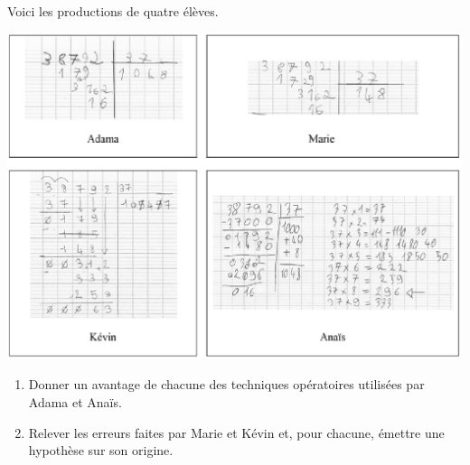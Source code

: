 \begin{exercice}[CRPE 2015 G1]
Voici les productions de quatre élèves.
\begin{center}
   \includegraphics[width=15cm]{Nombres_et_calculs_did/Images/Num3_analyse_divisions}
\end{center}
\begin{enumerate}
   \item Donner un avantage de chacune des techniques opératoires utilisées par Adama et Anaïs.
   \item Relever les erreurs faites par Marie et Kévin et, pour chacune, émettre une hypothèse sur son origine.
\end{enumerate}
\end{exercice}


